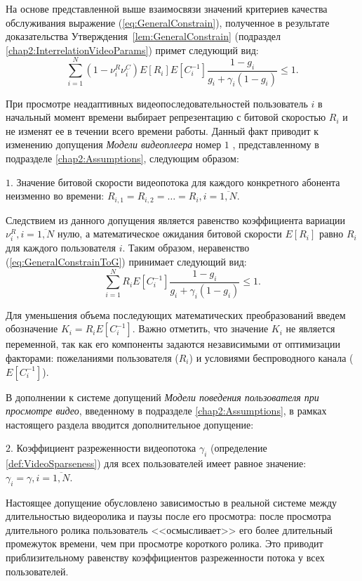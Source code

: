 На основе представленной выше взаимосвязи значений критериев качества обслуживания выражение (\ref{eq:GeneralConstrain}), полученное в результате доказательства Утверждения~\ref{lem:GeneralConstrain} (подраздел \ref{chap2:InterrelationVideoParams}) примет следующий вид:
\begin{equation}
	\label{eq:GeneralConstrainToG}
	\sum\limits_{i=1}^{N} {\left(1-\nu^R_i\nu^C_i\right)E[R_i]E[C_i^{-1}]\frac{1-g_i}{g_i + \gamma_i (1-g_i)}} \leq 1.
\end{equation}

При просмотре неадаптивных видеопоследовательностей пользователь $i$ в начальный момент времени выбирает репрезентацию с битовой скоростью $R_i$ и не изменят ее в течении всего времени работы. Данный факт приводит к изменению допущения \textit{Модели видеоплеера} номер $1$ , представленному в подразделе \ref{chap2:Assumptions}, следующим образом:

$1.$   Значение битовой скорости видеопотока для каждого конкретного абонента неизменно во времени: $R_{i,1} = R_{i,2} = \ldots = R_i, i=\overline{1,N}$.

Следствием из данного допущения является равенство коэффициента вариации $\nu^R_i, i=\overline{1,N}$ нулю, а математическое ожидания битовой скорости $E[R_i]$ равно $R_i$ для каждого пользователя $i$. Таким образом, неравенство (\ref{eq:GeneralConstrainToG}) принимает следующий вид:
$$\sum\limits_{i=1}^{N} {R_i E[C_i^{-1}]\frac{1-g_i}{g_i + \gamma_i (1-g_i)}} \leq 1.$$

Для уменьшения объема последующих математических преобразований введем обозначение $K_i = R_i E[C_i^{-1}]$. Важно отметить, что значение $K_i$ не является переменной, так как его компоненты задаются независимыми от оптимизации факторами: пожеланиями пользователя ($R_i$) и условиями беспроводного канала ($E[C_i^{-1}]$).

В дополнении к системе допущений \textit{Модели поведения пользователя при просмотре видео}, введенному в подразделе \ref{chap2:Assumptions}, в рамках настоящего раздела вводится дополнительное допущение:

$2.$   Коэффициент разреженности видеопотока $\gamma_i$ (определение \ref{def:VideoSparseness}) для всех пользователей имеет равное значение: $\gamma_i = \gamma, i=\overline{1,N}$.

Настоящее допущение обусловлено зависимостью в реальной системе между длительностью видеоролика и паузы после его просмотра: после просмотра длительного ролика пользователь <<осмысливает>> его более длительный промежуток времени, чем при просмотре короткого ролика. Это приводит приблизительному равенству коэффициентов разреженности потока у всех пользователей.

